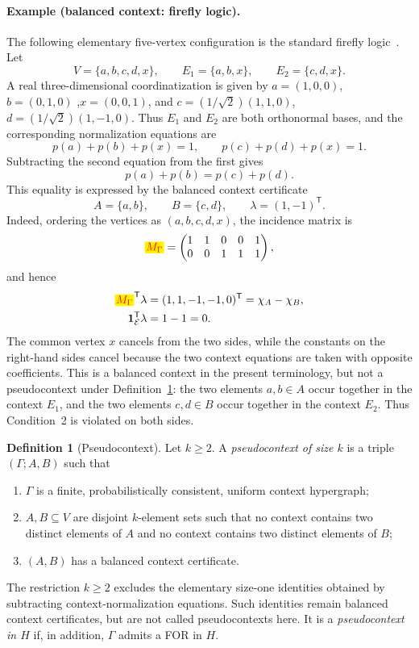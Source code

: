 \documentclass[
  twocolumn,
  aps,
  pra,
  floatfix,
  amsmath,amssymb,
  longbibliography
]{revtex4-2}
\theoremstyle{definition}
\newtheorem{definition}[theorem]{Definition}
\theoremstyle{remark}
\newcommand{\E}{\mathcal E}
\newcommand{\one}{\mathbf 1}
\newcommand{\corrmath}[1]{\begingroup\setlength{\fboxsep}{1pt}\colorbox{yellow}{\ensuremath{\color{red}#1}}\endgroup}
\begin{document}
\paragraph{Example (balanced context: firefly logic).}
The following elementary five-vertex configuration is the standard firefly
logic~\cite{cohen}.  Let
\[
 V=\{a,b,c,d,x\},
 \qquad
 E_1=\{a,b,x\},
 \qquad
 E_2=\{c,d,x\}.
\]
A real three-dimensional coordinatization is given by
\(a=(1,0,0)\),  \(b=(0,1,0)\) ,\(x=(0,0,1)\),
and
\(c=(1/\sqrt{2})(1,1,0)\),
\(d=(1/\sqrt{2})(1,-1,0)
\).
Thus $E_1$ and $E_2$ are both orthonormal bases, and the corresponding
normalization equations are
\[
 p(a)+p(b)+p(x)=1,
 \qquad
 p(c)+p(d)+p(x)=1.
\]
Subtracting the second equation from the first gives
\[
 p(a)+p(b)=p(c)+p(d).
\]
This equality is expressed by the balanced context certificate
\[
 A=\{a,b\},
 \qquad
 B=\{c,d\},
 \qquad
 \lambda=(1,-1)^{\mathsf T}.
\]
Indeed, ordering the vertices as $(a,b,c,d,x)$, the incidence matrix is
\[
 \corrmath{M_\Gamma}=
 \begin{pmatrix}
  1&1&0&0&1\\
  0&0&1&1&1
 \end{pmatrix},
\]
and hence
\[
 \begin{split}
  \corrmath{M_\Gamma}^{\mathsf T}\lambda
  &= (1,1,-1,-1,0)^{\mathsf T}
   =\chi_A-\chi_B,\\
  \one_\E^{\mathsf T}\lambda&=1-1=0.
 \end{split}
\]
The common vertex $x$ cancels from the two sides, while the constants on
the right-hand sides cancel because the two context equations are taken
with opposite coefficients.  This is a balanced context in the present
terminology, but not a pseudocontext under Definition~\ref{def:pseudocontext}:
the two elements $a,b\in A$ occur together in the context $E_1$, and the two
elements $c,d\in B$ occur together in the context $E_2$.  Thus Condition~2
is violated on both sides.

\begin{definition}[Pseudocontext]
\label{def:pseudocontext}
Let $k\ge2$.  A \emph{pseudocontext of size $k$} is a triple
$(\Gamma;A,B)$ such that
\begin{enumerate}
  \item $\Gamma$ is a finite, probabilistically consistent, uniform context
        hypergraph;
  \item $A,B\subseteq V$ are disjoint $k$-element sets such that no context
        contains two distinct elements of $A$ and no context contains two
        distinct elements of $B$;
  \item $(A,B)$ has a balanced context certificate.
\end{enumerate}
The restriction $k\ge2$ excludes the elementary size-one identities
obtained by subtracting context-normalization equations.  Such identities
remain balanced context certificates, but are not called pseudocontexts
here.
It is a \emph{pseudocontext in $H$} if, in addition, $\Gamma$ admits a FOR
in $H$.
\end{definition}
\end{document}
